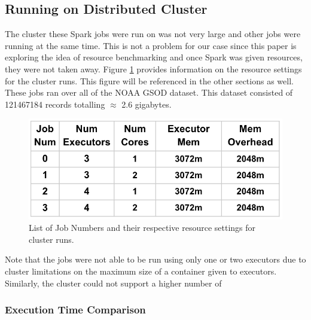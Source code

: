 \documentclass[conference]{IEEEtran}
\begin{document}
\subsection{Running on Distributed Cluster}
The cluster these Spark jobs were run on was not very large and other jobs were running at the same time.
This is not a problem for our case since this paper is exploring the idea of resource benchmarking and once Spark was given resources, they were not taken away.
Figure \ref{fig:clusterjobs} provides information on the resource settings for the cluster runs.
This figure will be referenced in the other sections as well.
These jobs ran over all of the NOAA GSOD dataset.
This dataset consisted of 121467184 records totalling $\approx$ 2.6 gigabytes.

\begin{figure}
    \includegraphics[width=\linewidth]{cluster_run_settings.PNG}
    \caption{List of Job Numbers and their respective resource settings for cluster runs.}
    \label{fig:clusterjobs}
\end{figure}

Note that the jobs were not able to be run using only one or two executors due to cluster limitations on the maximum size of a container given to executors.
Similarly, the cluster could not support a higher number of

\subsubsection{Execution Time Comparison}
\end{document}
